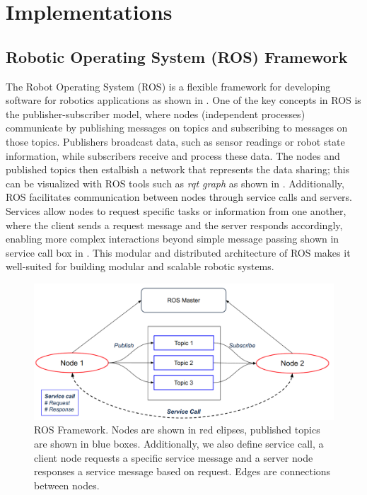 \section{Implementations}
\label{sec:implementation}
\subsection{Robotic Operating System (ROS) Framework}
The Robot Operating System (ROS) is a flexible framework for developing software for robotics applications as shown in . One of the key concepts in ROS is the publisher-subscriber model, where nodes (independent processes) communicate by publishing messages on topics and subscribing to messages on those topics. Publishers broadcast data, such as sensor readings or robot state information, while subscribers receive and process these data. The nodes and published topics then estalbish a network that represents the data sharing; this can be visualized with ROS tools such as \emph{rqt graph} as shown in . Additionally, ROS facilitates communication between nodes through service calls and servers. Services allow nodes to request specific tasks or information from one another, where the client sends a request message and the server responds accordingly, enabling more complex interactions beyond simple message passing shown in service call box in . This modular and distributed architecture of ROS makes it well-suited for building modular and scalable robotic systems. 
\begin{figure}[htbp]
  \centering
  \includegraphics[width=0.8\columnwidth]{pics/Implementation_ros_framework2.png}
  \caption{ROS Framework. Nodes are shown in red elipses, published topics are shown in blue boxes. Additionally, we also define service call, a client node requests a specific service message and a server node responses a service message based on request. Edges are connections between nodes.}
  \label{fig:implementation_ros}
\end{figure}

